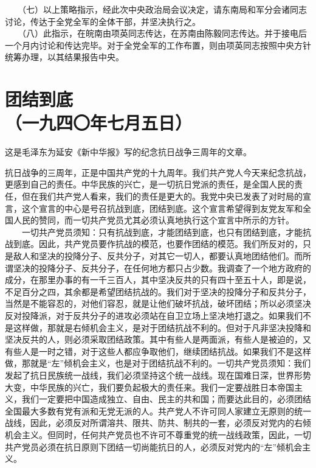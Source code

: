 \documentclass[cn,11pt,chinese]{elegantbook}
\def\myformat#1{\hfil\hfil #1}
\begin{document}
　　（七）以上策略指示，经此次中央政治局会议决定，请东南局和军分会诸同志讨论，传达于全党全军的全体干部，并坚决执行之。\\
　　（八）此指示，在皖南由项英同志传达，在苏南由陈毅同志传达。并于接电后一个月内讨论和传达完毕。对于全党全军的工作布置，则由项英同志按照中央方针统筹办理，以其结果报告中央。\\
\newpage\section*{\myformat{团结到底}\\\myformat{（一九四〇年七月五日）}}
\begin{introduction}\item  这是毛泽东为延安《新中华报》写的纪念抗日战争三周年的文章。\end{introduction}
抗日战争的三周年，正是中国共产党的十九周年。我们共产党人今天来纪念抗战，更感到自己的责任。中华民族的兴亡，是一切抗日党派的责任，是全国人民的责任，但在我们共产党人看来，我们的责任是更大的。我党中央已发表了对时局的宣言，这个宣言的中心是号召抗战到底，团结到底。这个宣言希望得到友党友军和全国人民的赞同，而一切共产党员尤其必须认真地执行这个宣言中所示的方针。\\
　　一切共产党员须知：只有抗战到底，才能团结到底，也只有团结到底，才能抗战到底。因此，共产党员要作抗战的模范，也要作团结的模范。我们所反对的，只是敌人和坚决的投降分子、反共分子，对其它一切人，都要认真地团结他们。而所谓坚决的投降分子、反共分子，在任何地方都只占少数。我调查了一个地方政府的成分，在那里办事的有一千三百人，其中坚决反共的只有四十至五十人，即是说，不足百分之四，其余都是希望团结抗战的。我们对于坚决的投降分子和反共分子，当然是不能容忍的，对他们容忍，就是让他们破坏抗战，破坏团结；所以必须坚决反对投降派，对于反共分子的进攻必须站在自卫立场上坚决地打退之。如果我们不是这样做，那就是右倾机会主义，是对于团结抗战不利的。但对于凡非坚决投降和坚决反共的人，则必须采取团结政策。其中有些人是两面派，有些人是被迫的，又有些人是一时之错，对于这些人都应争取他们，继续团结抗战。如果我们不是这样做，那就是“左”倾机会主义，也是对于团结抗战不利的。一切共产党员须知：我们发起了抗日民族统一战线，我们必须坚持这个统一战线。现在国难日深，世界形势大变，中华民族的兴亡，我们要负起极大的责任来。我们一定要战胜日本帝国主义，我们一定要把中国造成独立、自由、民主的共和国；而要达此目的，必须团结全国最大多数有党有派和无党无派的人。共产党人不许可同人家建立无原则的统一战线，因此，必须反对所谓溶共、限共、防共、制共的一套，必须反对党内的右倾机会主义。但同时，任何共产党员也不许可不尊重党的统一战线政策，因此，一切共产党员必须在抗日原则下团结一切尚能抗日的人，必须反对党内的“左”倾机会主义。\\
\end{document}
